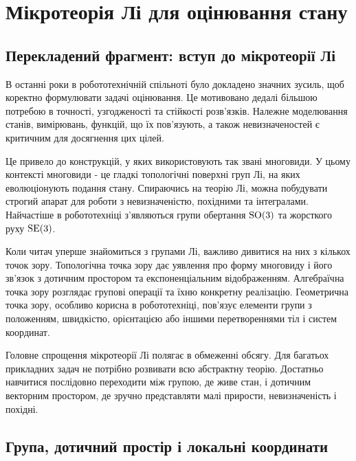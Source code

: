 \chapter{Мікротеорія Лі для оцінювання стану}

\section{Перекладений фрагмент: вступ до мікротеорії Лі}


В останні роки в робототехнічній спільноті було докладено значних зусиль, щоб коректно формулювати задачі оцінювання. Це мотивовано дедалі більшою потребою в точності, узгодженості та стійкості розв'язків. Належне моделювання станів, вимірювань, функцій, що їх пов'язують, а також невизначеностей є критичним для досягнення цих цілей.

Це привело до конструкцій, у яких використовують так звані многовиди. У цьому контексті многовиди - це гладкі топологічні поверхні груп Лі, на яких еволюціонують подання стану. Спираючись на теорію Лі, можна побудувати строгий апарат для роботи з невизначеністю, похідними та інтегралами. Найчастіше в робототехніці з'являються групи обертання $\mathrm{SO}(3)$ та жорсткого руху $\mathrm{SE}(3)$.

Коли читач уперше знайомиться з групами Лі, важливо дивитися на них з кількох точок зору. Топологічна точка зору дає уявлення про форму многовиду і його зв'язок з дотичним простором та експоненціальним відображенням. Алгебраїчна точка зору розглядає групові операції та їхню конкретну реалізацію. Геометрична точка зору, особливо корисна в робототехніці, пов'язує елементи групи з положенням, швидкістю, орієнтацією або іншими перетвореннями тіл і систем координат.

Головне спрощення мікротеорії Лі полягає в обмеженні обсягу. Для багатьох прикладних задач не потрібно розвивати всю абстрактну теорію. Достатньо навчитися послідовно переходити між групою, де живе стан, і дотичним векторним простором, де зручно представляти малі прирости, невизначеність і похідні.

\section{Група, дотичний простір і локальні координати}

